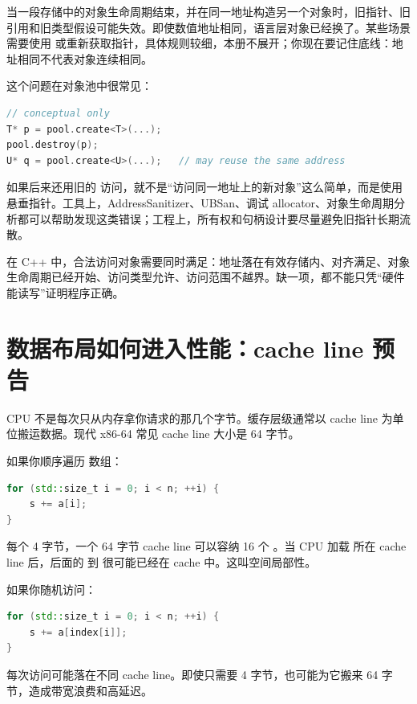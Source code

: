 当一段存储中的对象生命周期结束，并在同一地址构造另一个对象时，旧指针、旧引用和旧类型假设可能失效。即使数值地址相同，语言层对象已经换了。某些场景需要使用  或重新获取指针，具体规则较细，本册不展开；你现在要记住底线：地址相同不代表对象连续相同。

这个问题在对象池中很常见：

\begin{lstlisting}[language=C++]
// conceptual only
T* p = pool.create<T>(...);
pool.destroy(p);
U* q = pool.create<U>(...);   // may reuse the same address
\end{lstlisting}

如果后来还用旧的  访问，就不是“访问同一地址上的新对象”这么简单，而是使用悬垂指针。工具上，AddressSanitizer、UBSan、调试 allocator、对象生命周期分析都可以帮助发现这类错误；工程上，所有权和句柄设计要尽量避免旧指针长期流散。

\begin{warningbox}
在 C++ 中，合法访问对象需要同时满足：地址落在有效存储内、对齐满足、对象生命周期已经开始、访问类型允许、访问范围不越界。缺一项，都不能只凭“硬件能读写”证明程序正确。
\end{warningbox}

\section{数据布局如何进入性能：cache line 预告}

CPU 不是每次只从内存拿你请求的那几个字节。缓存层级通常以 cache line 为单位搬运数据。现代 x86-64 常见 cache line 大小是 64 字节。

如果你顺序遍历  数组：

\begin{lstlisting}[language=C++]
for (std::size_t i = 0; i < n; ++i) {
    s += a[i];
}
\end{lstlisting}

每个  4 字节，一个 64 字节 cache line 可以容纳 16 个 。当 CPU 加载  所在 cache line 后，后面的  到  很可能已经在 cache 中。这叫空间局部性。

如果你随机访问：

\begin{lstlisting}[language=C++]
for (std::size_t i = 0; i < n; ++i) {
    s += a[index[i]];
}
\end{lstlisting}

每次访问可能落在不同 cache line。即使只需要 4 字节，也可能为它搬来 64 字节，造成带宽浪费和高延迟。

